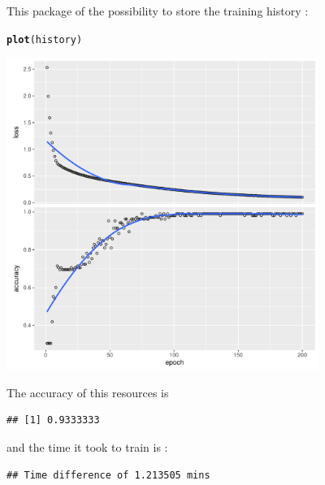 \documentclass[6pt,letter]{article}\usepackage[]{graphicx}\usepackage[]{color}
\makeatletter
\newcommand{\hlstd}[1]{\textcolor[rgb]{0.345,0.345,0.345}{#1}}%
\newcommand{\hlkwd}[1]{\textcolor[rgb]{0.737,0.353,0.396}{\textbf{#1}}}%
\newenvironment{kframe}{%
 \def\at@end@of@kframe{}%
 \ifinner\ifhmode%
  \def\at@end@of@kframe{\end{minipage}}%
  \begin{minipage}{\columnwidth}%
 \fi\fi%
 \def\FrameCommand##1{\hskip\@totalleftmargin \hskip-\fboxsep
 \colorbox{shadecolor}{##1}\hskip-\fboxsep
     \hskip-\linewidth \hskip-\@totalleftmargin \hskip\columnwidth}%
 \MakeFramed {\advance\hsize-\width
   \@totalleftmargin\z@ \linewidth\hsize
   \@setminipage}}%
 {\par\unskip\endMakeFramed%
 \at@end@of@kframe}
\newenvironment{knitrout}{}{} %
\makeatother
\begin{document}
This package of the possibility to store the training history :
\begin{knitrout}
\color{fgcolor}\begin{kframe}
\begin{alltt}
\hlkwd{plot}\hlstd{(history)}
\end{alltt}


{\ttfamily\noindent\itshape{}}\end{kframe}
\includegraphics[width=4in]{figure/unnamed-chunk-10-1} 

\end{knitrout}

The accuracy of this resources is
\begin{knitrout}
\color{fgcolor}\begin{kframe}
\begin{verbatim}
## [1] 0.9333333
\end{verbatim}
\end{kframe}
\end{knitrout}
and the time it took to train is :
\begin{knitrout}
\color{fgcolor}\begin{kframe}
\begin{verbatim}
## Time difference of 1.213505 mins
\end{verbatim}
\end{kframe}
\end{knitrout}
\end{document}
